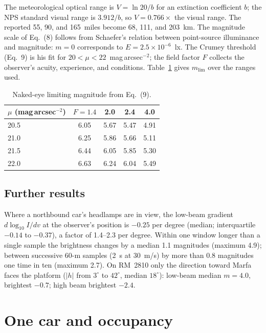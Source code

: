 \documentclass[11pt]{article}
\begin{document}
The meteorological optical range is $V=\ln20/b$ for an extinction coefficient $b$; the NPS standard visual range\cite{NPS_BIBE} is $3.912/b$, so $V=0.766\times$ the visual range. The reported 55, 90, and 165~miles become 68, 111, and 203~km. The magnitude scale of Eq.~(8) follows from Schaefer's relation\cite{Schaefer1993} between point-source illuminance and magnitude: $m=0$ corresponds to $E=2.5\times10^{-6}$~lx. The Crumey threshold (Eq.~9) is his fit\cite{Crumey2014} for $20<\mu<22$~mag\,arcsec$^{-2}$; the field factor $F$ collects the observer's acuity, experience, and conditions. Table~\ref{t:mlim} gives $m_{\mathrm{lim}}$ over the ranges used.

\begin{table}[htbp]
\caption{Naked-eye limiting magnitude from Eq.~(9).}
\label{t:mlim}
\small
\begin{tabular}{lcccc}
\toprule
$\mu$ (mag\,arcsec$^{-2}$) & $F=1.4$ & 2.0 & 2.4 & 4.0\\
\midrule
20.5 & 6.05 & 5.67 & 5.47 & 4.91\\
21.0 & 6.25 & 5.86 & 5.66 & 5.11\\
21.5 & 6.44 & 6.05 & 5.85 & 5.30\\
22.0 & 6.63 & 6.24 & 6.04 & 5.49\\
\bottomrule
\end{tabular}
\end{table}

\subsection{Further results}

Where a northbound car's headlamps are in view, the low-beam gradient $d\log_{10}I/dv$ at the observer's position is $-0.25$ per degree (median; interquartile $-0.14$ to $-0.37$), a factor of 1.4--2.3 per degree. Within one window longer than a single sample the brightness changes by a median 1.1 magnitudes (maximum 4.9); between successive 60-m samples (2~s at 30~m/s) by more than 0.8 magnitudes one time in ten (maximum 2.7). On RM~2810 only the direction toward Marfa faces the platform ($|h|$ from $3^\circ$ to $42^\circ$, median $18^\circ$): low-beam median $m=4.0$, brightest $-0.7$; high beam brightest $-2.4$.

\section{One car and occupancy}\label{s:occupancy}
\end{document}
